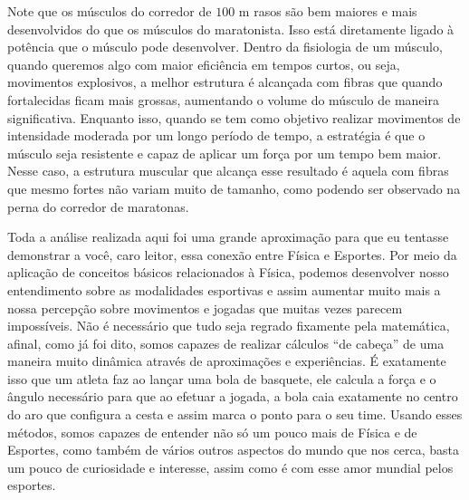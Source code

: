 \begin{multicols}{2}
Note que os músculos do corredor de $100$ m rasos são bem maiores e mais desenvolvidos do que os músculos do maratonista. Isso está diretamente ligado à potência que o músculo pode desenvolver. Dentro da fisiologia de um músculo, quando queremos algo com maior eficiência em tempos curtos, ou seja, movimentos explosivos, a melhor estrutura é alcançada com fibras que quando fortalecidas ficam mais grossas, aumentando o volume do músculo de maneira significativa. Enquanto isso, quando se tem como objetivo realizar movimentos de intensidade moderada por um longo período de tempo, a estratégia é que o músculo seja resistente e capaz de aplicar um força por um tempo bem maior. Nesse caso, a estrutura muscular que alcança esse resultado é aquela com fibras que mesmo fortes não variam muito de tamanho, como podendo ser observado na perna do corredor de maratonas.

Toda a análise realizada aqui foi uma grande aproximação para que eu tentasse demonstrar a você, caro leitor, essa conexão entre Física e Esportes. Por meio da aplicação de conceitos básicos relacionados à Física, podemos desenvolver nosso entendimento sobre as modalidades esportivas e assim aumentar muito mais a nossa percepção sobre movimentos e jogadas que muitas vezes parecem impossíveis. Não é necessário que tudo seja regrado fixamente pela matemática, afinal, como já foi dito, somos capazes de realizar cálculos ``de cabeça'' de uma maneira muito dinâmica através de aproximações e experiências. É exatamente isso que um atleta faz ao lançar uma bola de basquete, ele calcula a força e o ângulo necessário para que ao efetuar a jogada, a bola caia exatamente no centro do aro que configura a cesta e assim marca o ponto para o seu time. Usando esses métodos, somos capazes de entender não só um pouco mais de Física e de Esportes, como também de vários outros aspectos do mundo que nos cerca, basta um pouco de curiosidade e interesse, assim como é com esse amor mundial pelos esportes.



\end{multicols}